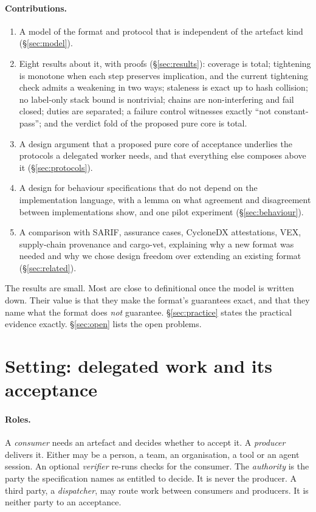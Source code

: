 \documentclass[11pt]{article}
\theoremstyle{definition}
\theoremstyle{remark}
\begin{document}
\paragraph{Contributions.}
\begin{enumerate}[leftmargin=*,itemsep=1pt]
\item A model of the format and protocol that is independent of the artefact kind (§\ref{sec:model}).
\item Eight results about it, with proofs (§\ref{sec:results}): coverage is total; tightening is
  monotone when each step preserves implication, and the current tightening check admits a
  weakening in two ways;
  staleness is exact up to hash collision; no label-only stack bound is nontrivial; chains are
  non-interfering and fail closed; duties are separated; a failure control witnesses exactly
  ``not constant-pass''; and the verdict fold of the proposed pure core is total.
\item A design argument that a proposed pure core of acceptance underlies the protocols a
  delegated worker needs, and that everything else composes above it (§\ref{sec:protocols}).
\item A design for behaviour specifications that do not depend on the implementation language,
  with a lemma on what agreement and disagreement between implementations show, and one pilot
  experiment (§\ref{sec:behaviour}).
\item A comparison with SARIF, assurance cases, CycloneDX attestations, VEX, supply-chain
  provenance and cargo-vet, explaining why a new format was needed and why we chose design freedom
  over extending an existing format (§\ref{sec:related}).
\end{enumerate}

The results are small. Most are close to definitional once the model is written down. Their value
is that they make the format's guarantees exact, and that they name what the format does \emph{not}
guarantee. §\ref{sec:practice} states the practical evidence exactly. §\ref{sec:open} lists the open
problems.

\section{Setting: delegated work and its acceptance}\label{sec:setting}

\paragraph{Roles.} A \emph{consumer} needs an artefact and decides whether to accept it. A
\emph{producer} delivers it. Either may be a person, a team, an organisation, a tool or an agent
session. An optional \emph{verifier} re-runs checks for the consumer. The \emph{authority} is the
party the specification names as entitled to decide. It is never the producer. A third party, a
\emph{dispatcher}, may route work between consumers and producers. It is neither party to an
acceptance.
\end{document}
